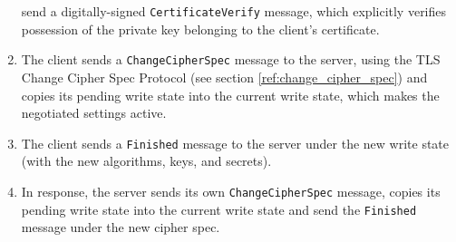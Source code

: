 \begin{enumerate}
              send a digitally-signed \texttt{CertificateVerify} message, which
              explicitly verifies possession of the private key belonging to the
              client's certificate.
        \item The client sends a \texttt{ChangeCipherSpec} message to the server,
              using the TLS Change Cipher Spec Protocol (see
              section \ref{ref:change_cipher_spec}) and copies its pending write state
              into the current write state, which makes the negotiated settings active.
        \item The client sends a \texttt{Finished} message to the server under
              the new write state (with the new algorithms, keys, and secrets).
        \item In response, the server sends its own \texttt{ChangeCipherSpec}
              message, copies its pending write state into the current write
              state and send the \texttt{Finished} message under the new cipher
              spec.
    \end{enumerate}

